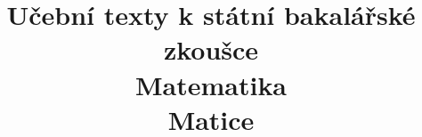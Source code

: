 \clearpage

\clearpage

\title{\LARGE Učební texty k státní bakalářské zkoušce \\ Matematika \\ Matice}



\maketitle

\newpage
\setcounter{section}{11}



